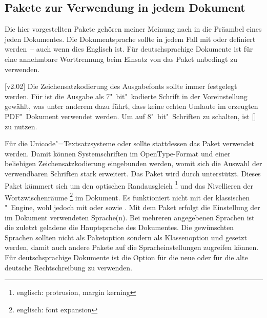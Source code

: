 \subsection{Pakete zur Verwendung in jedem Dokument}

Die hier vorgestellten Pakete gehören meiner Meinung nach in die Präambel eines 
jeden Dokumentes. Die Dokumentsprache sollte in jedem Fall mit  
oder  definiert werden~-- auch wenn dies Englisch ist. Für 
deutschsprachige Dokumente ist für eine annehmbare Worttrennung beim Einsatz 
von  das Paket  unbedingt zu verwenden.

\begin{DeclarePackages}
[v2.02]
  Die Zeichensatzkodierung des Ausgabefonts sollte immer festgelegt werden. Für 
   ist die Ausgabe als 7"~bit"~kodierte Schrift in der 
  Voreinstellung gewählt, was unter anderem dazu führt, dass keine echten
  Umlaute im erzeugten PDF"~Dokument verwendet werden. Um auf 8"~bit"~Schriften
  zu schalten, ist [] zu
  nutzen.
  
  Für die Unicode"=Textsatzsysteme  oder  
  sollte stattdessen das Paket  verwendet werden. Damit 
  können Systemschriften im OpenType-Format und einer beliebigen 
  Zeichensatzkodierung eingebunden werden, womit sich die Auswahl der 
  verwendbaren Schriften stark erweitert. Das Paket wird durch \TUDScript 
  unterstützt.
  Dieses Paket kümmert sich um den optischen Randausgleich%
  \footnote{englisch: protrusion, margin kerning}
  und das Nivellieren der Wortzwischenräume%
  \footnote{englisch: font expansion}
  im Dokument. Es funktioniert nicht mit der klassischen "~Engine, 
  wohl jedoch mit  oder  sowie .
  Mit dem Paket  erfolgt die Einstellung der im Dokument 
  verwendeten Sprache(n). Bei mehreren angegebenen Sprachen ist die zuletzt 
  geladene die Hauptsprache des Dokumentes. Die gewünschten Sprachen sollten 
  nicht als Paketoption sondern als Klassenoption und gesetzt werden, damit 
  auch andere Pakete auf die Spracheinstellungen zugreifen können. Für 
  deutschsprachige Dokumente ist die Option  für die neue oder 
   für die alte deutsche Rechtschreibung zu verwenden. 
  

\end{DeclarePackages}
